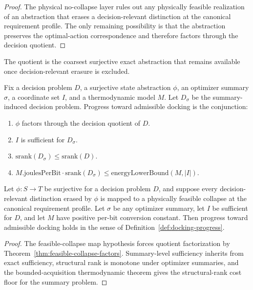 \begin{proof}
The physical no-collapse layer rules out any physically feasible realization of an abstraction that erases a decision-relevant distinction at the canonical requirement profile. The only remaining possibility is that the abstraction preserves the optimal-action correspondence and therefore factors through the decision quotient.
\end{proof}

The quotient is the coarsest surjective exact abstraction that remains available once decision-relevant erasure is excluded.

\begin{definition}\label{def:docking-progress}
Fix a decision problem $D$, a surjective state abstraction $\phi$, an optimizer summary $\sigma$, a coordinate set $I$, and a thermodynamic model $M$. Let $D_\sigma$ be the summary-induced decision problem. Progress toward admissible docking is the conjunction:
\begin{enumerate}
\item $\phi$ factors through the decision quotient of $D$.
\item $I$ is sufficient for $D_\sigma$.
\item $\mathrm{srank}(D_\sigma) \le \mathrm{srank}(D)$.
\item $M.\mathrm{joulesPerBit}\cdot \mathrm{srank}(D_\sigma) \le \mathrm{energyLowerBound}(M,|I|)$.
\end{enumerate}
\end{definition}

\begin{theorem}\label{thm:admissible-docking-exhaustion}
Let $\phi : S \to T$ be surjective for a decision problem $D$, and suppose every decision-relevant distinction erased by $\phi$ is mapped to a physically feasible collapse at the canonical requirement profile. Let $\sigma$ be any optimizer summary, let $I$ be sufficient for $D$, and let $M$ have positive per-bit conversion constant. Then progress toward admissible docking holds in the sense of Definition~\ref{def:docking-progress}.
\end{theorem}

\begin{proof}
The feasible-collapse map hypothesis forces quotient factorization by Theorem~\ref{thm:feasible-collapse-factors}. Summary-level sufficiency inherits from exact sufficiency, structural rank is monotone under optimizer summaries, and the bounded-acquisition thermodynamic theorem gives the structural-rank cost floor for the summary problem.
\end{proof}

